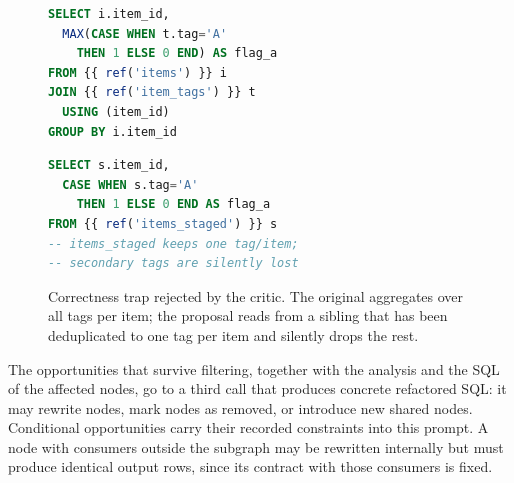 \begin{figure}[!htbp]
\begin{minipage}[t]{0.48\linewidth}
\begin{lstlisting}[language=SQL]
SELECT i.item_id,
  MAX(CASE WHEN t.tag='A'
    THEN 1 ELSE 0 END) AS flag_a
FROM {{ ref('items') }} i
JOIN {{ ref('item_tags') }} t
  USING (item_id)
GROUP BY i.item_id
\end{lstlisting}
\end{minipage}
\hfill
\begin{minipage}[t]{0.48\linewidth}
\begin{lstlisting}[language=SQL]
SELECT s.item_id,
  CASE WHEN s.tag='A'
    THEN 1 ELSE 0 END AS flag_a
FROM {{ ref('items_staged') }} s
-- items_staged keeps one tag/item;
-- secondary tags are silently lost
\end{lstlisting}
\end{minipage}
\inv
\caption{Correctness trap rejected by the critic. The original aggregates over all tags per item; the proposal reads from a sibling that has been deduplicated to one tag per item and silently drops the rest.}
\label{fig:critic-catch}
\inv
\end{figure}

The opportunities that survive filtering, together with the analysis and the SQL of the affected nodes, go to a third call that produces concrete refactored SQL: it may rewrite nodes, mark nodes as removed, or introduce new shared nodes. Conditional opportunities carry their recorded constraints into this prompt. A node with consumers outside the subgraph may be rewritten internally but must produce identical output rows, since its contract with those consumers is fixed.


